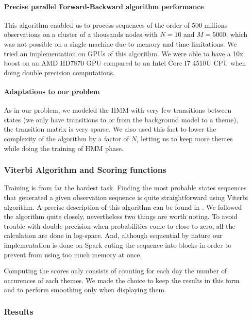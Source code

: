 \paragraph{Precise parallel Forward-Backward algorithm performance}
This algorithm enabled us to process sequences of the order of 500 millions observations on a cluster of a thousands nodes with $N=10$ and $M=5000$, which was not possible on a single machine due to memory and time limitations.
We tried an implementation on GPUs of this algorithm. We were able to have a 10x boost on an AMD HD7870 GPU compared to an Intel Core I7 4510U CPU when doing double precision computations.

\paragraph{Adaptations to our problem}
As in our problem, we modeled the HMM with very few transitions between states (we only have transitions to or from the background model to a theme), the transition matrix is very sparse. We also used this fact to lower the complexity of the algorithm by a factor of $N$, letting us to keep more themes while doing the training of HMM phase.

\subsubsection{Viterbi Algorithm and Scoring functions}
Training is from far the hardest task. Finding the most probable states sequences that generated a given observation sequence is quite straightforward using Viterbi algorithm. A precise description of this algorithm can be found in \cite{rabiner1989tutorial}.
We followed the algorithm quite closely, nevertheless two things are worth noting. To avoid trouble with double precision when probabilities come to close to zero, all the calculation are done in log-space. And, although sequential by nature our implementation is done on Spark cuting the sequence into blocks in order to prevent from using too much memory at once.

Computing the scores only consists of counting for each day the number of occurences of each themes. We made the choice to keep the results in this form and to perform smoothing only when displaying them.

\subsubsection{Results}




